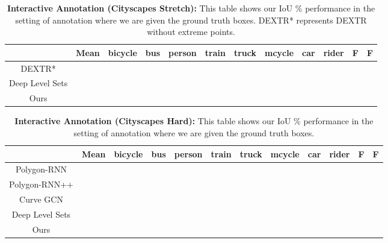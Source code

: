 \documentclass[10pt,twocolumn,letterpaper]{article}
\begin{document}
\begin{table*}[t!]
\centering
  \begin{tabular}{|c|c|cccccccc|cc|}
  \cline{2-12}
  \multicolumn{1}{c|}{}  & Mean & \multicolumn{1}{c}{bicycle} & \multicolumn{1}{c}{bus} & \multicolumn{1}{c}{person} & \multicolumn{1}{c}{train} & \multicolumn{1}{c}{truck} & \multicolumn{1}{c}{mcycle} & \multicolumn{1}{c}{car} & rider & \multicolumn{1}{c}{F} & \multicolumn{1}{c|}{F}  \\ 
  \hline 
  DEXTR* \cite{dextr} 
    & &  & & & & & & & & & \\ 
  Deep Level Sets \cite{wang2019delse} 
    & & & & & & & & & & & \\
  Ours 
    & & & & & & &  & & & &\\
  \hline 

  \end{tabular}
  \caption{\textbf{Interactive Annotation (Cityscapes Stretch):} This table shows our IoU \% performance in the setting of annotation where we are given the ground truth boxes. DEXTR* represents DEXTR without extreme points.}
  \label{tab:anno-results-stretch}
\end{table*}



\begin{table*}[t!]
\centering
  \begin{tabular}{|c|c|cccccccc|cc|}
  \cline{2-12}
  \multicolumn{1}{c|}{}  & Mean & \multicolumn{1}{c}{bicycle} & \multicolumn{1}{c}{bus} & \multicolumn{1}{c}{person} & \multicolumn{1}{c}{train} & \multicolumn{1}{c}{truck} & \multicolumn{1}{c}{mcycle} & \multicolumn{1}{c}{car} & rider & \multicolumn{1}{c}{F} & \multicolumn{1}{c|}{F}  \\ 
  \hline 
    
  Polygon-RNN \cite{polygon-rnn} 
    & & & & & & & & & & & \\ 
  Polygon-RNN++  \cite{polygon-rnn++} 
    & & & & & & & & & & & \\
  Curve GCN  \cite{ling2019fast} 
    & & & & & & & & & & &\\
  Deep Level Sets \cite{wang2019delse}
    & & & & & & & & & & &\\
  Ours 
    & & & & & & &  & & & &\\
  \hline 
  
  \end{tabular}
  \caption{\textbf{Interactive Annotation (Cityscapes Hard):} This table shows our IoU \% performance in the setting of annotation where we are given the ground truth boxes.}
  \label{tab:anno-results-hard}
  \vspace{-5mm}
\end{table*}
\end{document}
